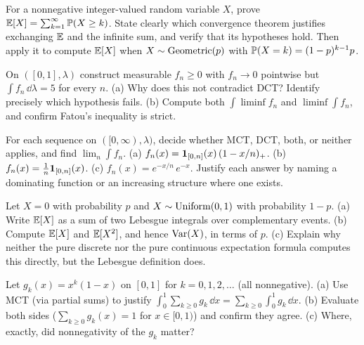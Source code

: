\begin{exercise}
\label{ch37:ex-tailsum}
For a nonnegative integer-valued random variable $X$, prove
$\E[X]=\sum_{k=1}^\infty\P(X\ge k)$. State clearly which convergence theorem
justifies exchanging $\E$ and the infinite sum, and verify that its hypotheses
hold. Then apply it to compute $\E[X]$ when $X\sim\Geom(p)$ with
$\P(X=k)=(1-p)^{k-1}p$.
\end{exercise}

\begin{exercise}
\label{ch37:ex-bump}
On $([0,1],\lambda)$ construct measurable $f_n\ge 0$ with $f_n\to 0$ pointwise
but $\int f_n\,\dd\lambda = 5$ for every $n$. (a) Why does this not contradict
DCT? Identify precisely which hypothesis fails. (b) Compute both
$\int\liminf f_n$ and $\liminf\int f_n$, and confirm Fatou's inequality is
strict.
\end{exercise}

\begin{exercise}
\label{ch37:ex-mctdct}
For each sequence on $([0,\infty),\lambda)$, decide whether MCT, DCT, both, or
neither applies, and find $\lim_n\int f_n$.
(a) $f_n(x)=\ind_{[0,n]}(x)\,(1-x/n)_+$.
(b) $f_n(x)=\frac{1}{n}\ind_{[0,n]}(x)$.
(c) $f_n(x)=e^{-x/n}\,e^{-x}$.
Justify each answer by naming a dominating function or an increasing structure
where one exists.
\end{exercise}

\begin{exercise}
\label{ch37:ex-mixed}
Let $X=0$ with probability $p$ and $X\sim\Unif(0,1)$ with probability $1-p$.
(a) Write $\E[X]$ as a sum of two Lebesgue integrals over complementary events.
(b) Compute $\E[X]$ and $\E[X^2]$, and hence $\Var(X)$, in terms of $p$.
(c) Explain why neither the pure discrete nor the pure continuous expectation
formula computes this directly, but the Lebesgue definition does.
\end{exercise}

\begin{exercise}
\label{ch37:ex-termbyterm}
Let $g_k(x)=x^{k}(1-x)$ on $[0,1]$ for $k=0,1,2,\dots$ (all nonnegative).
(a) Use MCT (via partial sums) to justify $\int_0^1 \sum_{k\ge0} g_k\,\dd x
= \sum_{k\ge0}\int_0^1 g_k\,\dd x$. (b) Evaluate both sides
($\sum_{k\ge0} g_k(x)=1$ for $x\in[0,1)$) and confirm they agree. (c) Where,
exactly, did nonnegativity of the $g_k$ matter?
\end{exercise}

